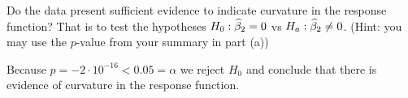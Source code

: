 
Do the data present sufficient evidence to indicate curvature in the response function?
That is to test the hypotheses $H_0 : \widehat{\beta}_2 = 0$ vs $H_a : \widehat{\beta}_2 \neq 0$.
(Hint: you may use the $p$-value from your summary in part (a))

\soln*
Because $p = -2 \cdot 10^{-16} < 0.05 = \alpha$ we reject $H_0$ and conclude that there is evidence of curvature in the response function.